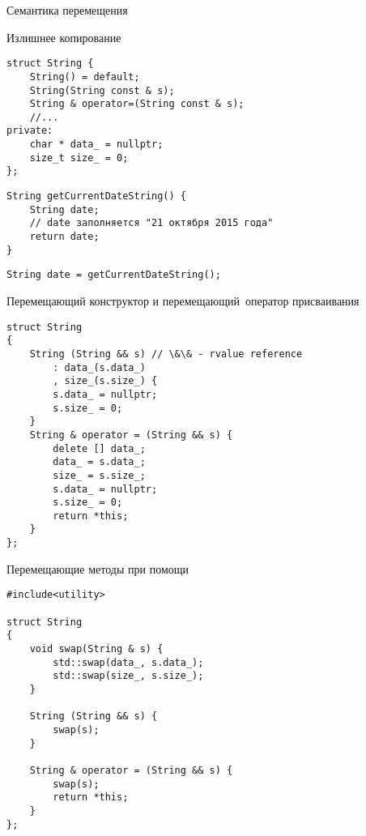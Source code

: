 \documentclass{beamer}
\begin{document}
\begin{frame}
\begin{center}
\huge Семантика перемещения
\end{center}
\end{frame}

\begin{frame}[fragile]{Излишнее копирование}
\begin{lstlisting}
struct String {
    String() = default;
    String(String const & s);
    String & operator=(String const & s);
    //...
private:
    char * data_ = nullptr;
    size_t size_ = 0;
};
\end{lstlisting}

\begin{lstlisting}
String getCurrentDateString() {
    String date;
    // date заполняется "21 октября 2015 года"
    return date;
}
\end{lstlisting}

\begin{lstlisting}
String date = getCurrentDateString();
\end{lstlisting}
\end{frame}

\begin{frame}[fragile]{Перемещающий конструктор и перемещающий~оператор присваивания}
\begin{lstlisting}
struct String 
{
    String (String && s) // \&\& - rvalue reference
        : data_(s.data_)
        , size_(s.size_) {
        s.data_ = nullptr;
        s.size_ = 0;
    }
    String & operator = (String && s) {
        delete [] data_;
        data_ = s.data_;
        size_ = s.size_;
        s.data_ = nullptr;
        s.size_ = 0;
        return *this;
    }
};
\end{lstlisting}
\end{frame}                                

\begin{frame}[fragile]{Перемещающие методы при помощи }
\begin{lstlisting}
#include<utility>

struct String 
{
    void swap(String & s) { 
        std::swap(data_, s.data_);
        std::swap(size_, s.size_);
    }

    String (String && s) { 
        swap(s);
    }
    
    String & operator = (String && s) {
        swap(s);
        return *this;
    }
};
\end{lstlisting}
\end{frame}
\end{document}
